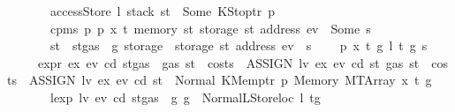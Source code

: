 \begin{isabellebody}
\ \ \ \ \ \ \ {\isachardoublequoteopen}accessStore\ l\ {\isacharparenleft}{\kern0pt}stack\ st{\isacharparenright}{\kern0pt}\ {\isacharequal}{\kern0pt}\ Some\ {\isacharparenleft}{\kern0pt}KStoptr\ p{\isacharprime}{\kern0pt}{\isacharparenright}{\kern0pt}{\isachardoublequoteclose}\isanewline
\ \ \ \ \ \ \ {\isachardoublequoteopen}cpm{}s\ p\ p{\isacharprime}{\kern0pt}\ x\ t\ {\isacharparenleft}{\kern0pt}memory\ st{\isacharparenright}{\kern0pt}\ {\isacharparenleft}{\kern0pt}storage\ st\ {\isacharparenleft}{\kern0pt}address\ ev{\isacharparenright}{\kern0pt}{\isacharparenright}{\kern0pt}\ {\isacharequal}{\kern0pt}\ Some\ s{\isachardoublequoteclose}\isanewline
\ \ \ \ \ \ \ {\isachardoublequoteopen}st{\isacharprime}{\kern0pt}\ {\isacharequal}{\kern0pt}\ st{\isasymlparr}gas\ {\isacharcolon}{\kern0pt}{\isacharequal}{\kern0pt}\ g{\isacharprime}{\kern0pt}{\isacharcomma}{\kern0pt}\ storage\ {\isacharcolon}{\kern0pt}{\isacharequal}{\kern0pt}\ {\isacharparenleft}{\kern0pt}storage\ st{\isacharparenright}{\kern0pt}\ {\isacharparenleft}{\kern0pt}address\ ev\ {\isacharcolon}{\kern0pt}{\isacharequal}{\kern0pt}\ s{\isacharparenright}{\kern0pt}{\isasymrparr}{\isachardoublequoteclose}\isanewline
\ \ {\isacharbar}{\kern0pt}\ {\isacharparenleft}{\kern0pt}{}{}{\isacharparenright}{\kern0pt}\ p\ x\ t\ g\ l\ t{\isacharprime}{\kern0pt}\ g{\isacharprime}{\kern0pt}\ s\isanewline
\ \ \ \ \ {\isachardoublequoteopen}expr\ ex\ ev\ cd\ {\isacharparenleft}{\kern0pt}st{\isasymlparr}gas\ {\isacharcolon}{\kern0pt}{\isacharequal}{\kern0pt}\ gas\ st\ {\isacharminus}{\kern0pt}\ costs\ \ {\isacharparenleft}{\kern0pt}ASSIGN\ lv\ ex{\isacharparenright}{\kern0pt}\ ev\ cd\ st{\isasymrparr}{\isacharparenright}{\kern0pt}\ {\isacharparenleft}{\kern0pt}gas\ st\ {\isacharminus}{\kern0pt}\ costs\ \ {\isacharparenleft}{\kern0pt}ASSIGN\ lv\ ex{\isacharparenright}{\kern0pt}\ ev\ cd\ st{\isacharparenright}{\kern0pt}\ {\isacharequal}{\kern0pt}\ Normal\ {\isacharparenleft}{\kern0pt}{\isacharparenleft}{\kern0pt}KMemptr\ p{\isacharcomma}{\kern0pt}\ Memory\ {\isacharparenleft}{\kern0pt}MTArray\ x\ t{\isacharparenright}{\kern0pt}{\isacharparenright}{\kern0pt}{\isacharcomma}{\kern0pt}\ g{\isacharparenright}{\kern0pt}{\isachardoublequoteclose}\isanewline
\ \ \ \ \ \ \ {\isachardoublequoteopen}lexp\ lv\ ev\ cd\ {\isacharparenleft}{\kern0pt}st{\isasymlparr}gas\ {\isacharcolon}{\kern0pt}{\isacharequal}{\kern0pt}\ g{\isasymrparr}{\isacharparenright}{\kern0pt}\ g\ {\isacharequal}{\kern0pt}\ Normal{\isacharparenleft}{\kern0pt}{\isacharparenleft}{\kern0pt}LStoreloc\ l{\isacharcomma}{\kern0pt}\ t{\isacharprime}{\kern0pt}{\isacharparenright}{\kern0pt}{\isacharcomma}{\kern0pt}g{\isacharprime}{\kern0pt}{\isacharparenright}{\kern0pt}{\isachardoublequoteclose}\isanewline

\end{isabellebody}
